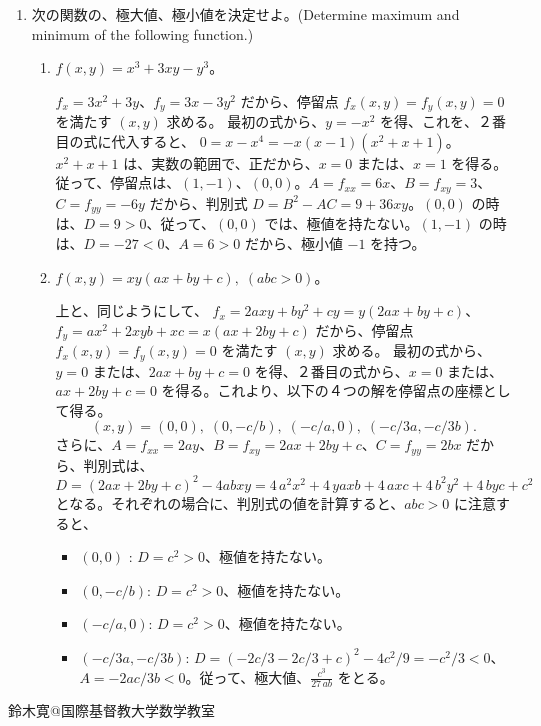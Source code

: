 \begin{enumerate}
\item 次の関数の、極大値、極小値を決定せよ。(Determine maximum and minimum of the following function.)
     \begin{enumerate}
     \item $f(x,y) = x^3 + 3xy - y^3$。
     
     \sol
     $f_x = 3x^2 + 3y$、$f_y = 3x - 3y^2$ だから、停留点 $f_x(x,y) = f_y(x,y) = 0$ を満たす $(x,y)$ 求める。
     最初の式から、$y = -x^2$ を得、これを、２番目の式に代入すると、
     $0 = x - x^4 = -x(x-1)(x^2+x+1)$。$x^2+x+1$ は、実数の範囲で、正だから、$x = 0$ または、$x = 1$ を得る。従って、停留点は、$(1,-1)、(0,0)$。$A = f_{xx} = 6x$、$B = f_{xy} = 3$、$C = f_{yy} = -6y$ だから、判別式 $D = B^2 - AC = 9+36xy$。$(0,0)$ の時は、$D = 9>0$、従って、$(0,0)$ では、極値を持たない。$(1,-1)$ の時は、$D = -27<0$、$A = 6>0$ だから、極小値 $-1$ を持つ。
     
     \item $f(x,y) = xy(ax+by+c), \; (abc > 0)$。
     
     \sol
     上と、同じようにして、
     $f_x = 2axy + by^2 + cy = y(2ax + by + c)$、$f_y = a{x}^{2}+2xyb+xc = x(ax+2by + c)$ だから、停留点 $f_x(x,y) = f_y(x,y) = 0$ を満たす $(x,y)$ 求める。
     最初の式から、$y = 0$ または、$2ax + by + c = 0$ を得、２番目の式から、$x = 0$ または、$ax + 2by + c = 0$ を得る。これより、以下の４つの解を停留点の座標として得る。
     $$(x,y) = (0,0),\;(0,-c/b),\;(-c/a,0),\;(-c/3a,-c/3b).$$
     さらに、$A = f_{xx} = 2ay$、$B = f_{xy} = 2ax+2by+c$、$C = f_{yy} = 2bx$ だから、判別式は、
     $$D = (2ax+2by+c)^2 - 4abxy = 4\,{a}^{2}{x}^{2}+4\,yaxb+4\,axc+4\,{b}^{2}{y}^{2}+4\,byc+{c}^{2}$$
     となる。それぞれの場合に、判別式の値を計算すると、$abc > 0$ に注意すると、
     \begin{itemize}
     \item $(0,0)$ : $D = c^2 > 0$、極値を持たない。
     \item $(0,-c/b)$: $D = c^2 > 0$、極値を持たない。
     \item $(-c/a,0)$: $D = c^2 > 0$、極値を持たない。
     \item $(-c/3a,-c/3b)$: $D = (-2c/3 - 2c/3 + c)^2 - 4c^2/9 = -c^2/3 < 0$、$A = -2ac/3b < 0$。従って、極大値、$\frac {{c}^{3}}{27\,ab}$ をとる。
     \end{itemize}
     \end{enumerate}
\end{enumerate}

\begin{flushright}
鈴木寛@国際基督教大学数学教室
\end{flushright}   


